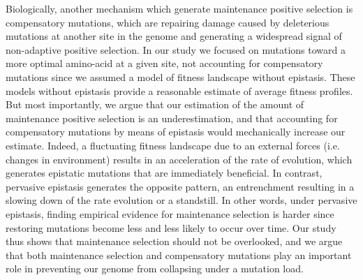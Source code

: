 \documentclass{article}
\begin{document}
    Biologically, another mechanism which generate maintenance positive selection is compensatory mutations, which are repairing damage caused by deleterious mutations at another site in the genome and generating a widespread signal of non-adaptive positive selection\cite{hartl_compensatory_1996, pollock_strong_2014, starr_epistasis_2016}.
    In our study we focused on mutations toward a more optimal amino-acid at a given site, not accounting for compensatory mutations since we assumed a model of fitness landscape without epistasis.
    These models without epistasis provide a reasonable estimate of average fitness profiles\cite{youssef_consequences_2020}.
    But most importantly, we argue that our estimation of the amount of maintenance positive selection is an underestimation, and that accounting for compensatory mutations by means of epistasis would mechanically increase our estimate.
    Indeed, a fluctuating fitness landscape due to an external forces (i.e. changes in environment) results in an acceleration of the rate of evolution\cite{ rodrigue_detecting_2017, rodrigue_bayesian_2021}, which generates epistatic mutations that are immediately beneficial\cite{gong_epistatically_2014}.
    In contrast, pervasive epistasis generates the opposite pattern, an entrenchment\cite{goldstein_evolutionary_2004, goldstein_nonadaptive_2015} resulting in a slowing down of the rate evolution\cite{rodrigue_detecting_2017, patel_epistasis_2022} or a standstill\cite{youssef_evolution_2022}.
    In other words, under pervasive epistasis, finding empirical evidence for maintenance selection is harder since restoring mutations become less and less likely to occur over time\cite{goldstein_nonadaptive_2015, goldstein_sequence_2017, park_epistatic_2022}.
    Our study thus shows that maintenance selection should not be overlooked, and we argue that both maintenance selection and compensatory mutations play an important role in preventing our genome from collapsing under a mutation load.
\end{document}

